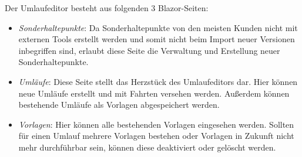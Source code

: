     Der Umlaufeditor besteht aus folgenden 3 Blazor-Seiten: 
    \begin{itemize}
        \item \emph{Sonderhaltepunkte}: Da Sonderhaltepunkte von den meisten Kunden nicht mit externen Tools erstellt werden und somit nicht beim Import neuer Versionen inbegriffen sind, 
                erlaubt diese Seite die Verwaltung und Erstellung neuer Sonderhaltepunkte.
        \item \emph{Umläufe}: Diese Seite stellt das Herzstück des Umlaufeditors dar. Hier können neue Umläufe erstellt und mit Fahrten versehen werden. Außerdem können bestehende Umläufe 
                als Vorlagen abgespeichert werden. 
        \item \emph{Vorlagen}: Hier können alle bestehenden Vorlagen eingesehen werden. Sollten für einen Umlauf mehrere Vorlagen bestehen oder Vorlagen in Zukunft nicht mehr durchführbar sein, können diese
                deaktiviert oder gelöscht werden.
    \end{itemize}



